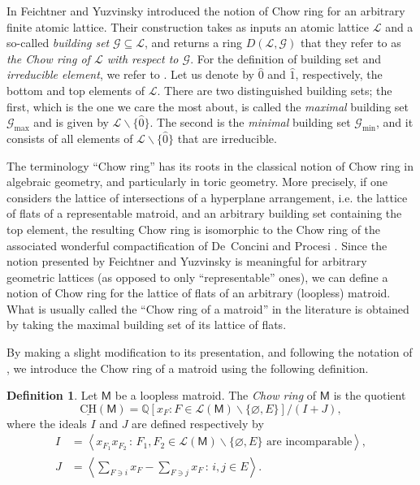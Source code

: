 \documentclass[11pt, a4paper, english]{amsart}
\theoremstyle{teoremas}
\theoremstyle{definition}
\newtheorem{definition}[theorem]{Definition}
\newcommand{\M}{\mathsf{M}}
\newcommand{\uCH}{\underline{\mathrm{CH}}}
\begin{document}
In \cite{feichtner-yuzvinsky} Feichtner and Yuzvinsky introduced the notion of Chow ring for an arbitrary finite atomic lattice. Their construction takes as inputs an atomic lattice $\mathcal{L}$ and a so-called \emph{building set} $\mathcal{G}\subseteq\mathcal{L}$, and returns a ring $D(\mathcal{L},\mathcal{G})$ that they refer to as \emph{the Chow ring of $\mathcal{L}$ with respect to $\mathcal{G}$}. For the definition of building set and \emph{irreducible element}, we refer to \cite[Definition~1]{feichtner-yuzvinsky}. Let us denote by $\widehat{0}$ and $\widehat{1}$, respectively, the bottom and top elements of $\mathcal{L}$. There are two distinguished building sets; the first, which is the one we care the most about, is called the \emph{maximal} building set $\mathcal{G}_{\max}$ and is given by $\mathcal{L}\smallsetminus\{\widehat{0}\}$. The second is the \emph{minimal} building set $\mathcal{G}_{\min}$, and it consists of all elements of $\mathcal{L}\smallsetminus\{\widehat{0}\}$ that are irreducible.

The terminology ``Chow ring'' has its roots in the classical notion of Chow ring in algebraic geometry, and particularly in toric geometry. More precisely, if one considers the lattice of intersections of a hyperplane arrangement, i.e. the lattice of flats of a representable matroid, and an arbitrary building set containing the top element, the resulting Chow ring is isomorphic to the Chow ring of the associated wonderful compactification of De~Concini and Procesi \cite{deconcini-procesi}. Since the notion presented by Feichtner and Yuzvinsky is meaningful for arbitrary geometric lattices (as opposed to only ``representable'' ones), we can define a notion of Chow ring for the lattice of flats of an arbitrary (loopless) matroid. What is usually called the ``Chow ring of a  matroid'' in the literature is obtained by taking the maximal building set of its lattice of flats.

By making a slight modification to its presentation, and following the notation of \cite{semismall}, we introduce the Chow ring of a matroid using the following definition.

\begin{definition}
    Let $\M$ be a loopless matroid. The \textit{Chow ring} of $\M$ is the quotient
        \[
        \uCH(\M) = \mathbb{Q}[x_F : F\in\mathcal{L}(\M)\smallsetminus\{\varnothing,E\}]/{(I+J)},
        \]
    where the ideals $I$ and $J$ are defined respectively by
    \begin{align*}
        I &= \left< x_{F_1} x_{F_2} \,:\, F_1,F_2 \in \mathcal{L}(\M)\smallsetminus\{\varnothing,E\} \text{ are incomparable}\right>,\\
        J &= \left< \sum_{F\ni i} x_F - \sum_{F\ni j} x_F \,:\, i,j\in E\right>.
    \end{align*}
\end{definition}
\end{document}
